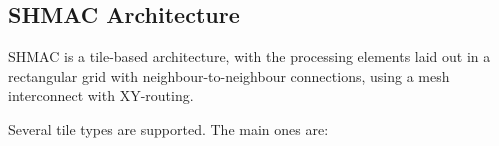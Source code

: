 

\subsection{SHMAC Architecture}

SHMAC is a tile-based architecture, with the processing elements laid out in a rectangular
grid with neighbour-to-neighbour connections, using a mesh interconnect with XY-routing.

Several tile types are supported. The main ones are:


